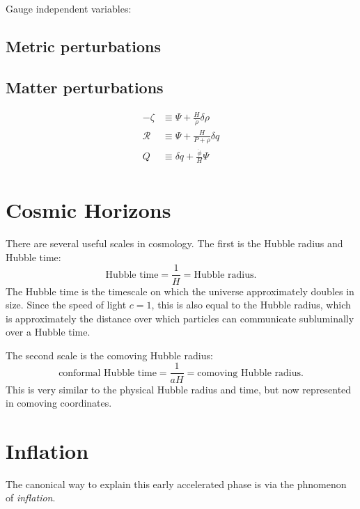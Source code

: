 Gauge independent variables:

\subsection{Metric perturbations}

\subsection{Matter perturbations}

\begin{align}
  -\zeta &\equiv \Psi + \frac{H}{\dot{\rho}}\delta\rho
  \label{eqn:cos:gauge_zeta}\\
  \mathcal{R} &\equiv \Psi + \frac{H}{P+\rho}\delta q
  \label{eqn:cos:gauge_R}\\
  Q &\equiv \delta q + \frac{\dot{\phi}}{H}\Psi
  \label{eqn:cos:gauge_Q}\\
\end{align}

\section{Cosmic Horizons}
There are several useful scales in cosmology. The first is the Hubble radius and Hubble time:
\begin{equation}
  \text{Hubble time} = \frac{1}{H} = \text{Hubble radius}.
  \label{eqn:cos:Hubble_def}
\end{equation}
The Hubble time is the timescale on which the universe approximately doubles in size. Since the speed of light $c=1$, this is also equal to the Hubble radius, which is approximately the distance over which particles can communicate subluminally over a Hubble time.

The second scale is the comoving Hubble radius:
\begin{equation}
  \text{conformal Hubble time} = \frac{1}{aH} = \text{comoving Hubble radius}.
  \label{eqn:cos:com_Hubble_def}
\end{equation}
This is very similar to the physical Hubble radius and time, but now represented in comoving coordinates.

%
%


\section{Inflation}
The canonical way to explain this early accelerated phase is via the phnomenon of {\em inflation}.


\clearpage{}

